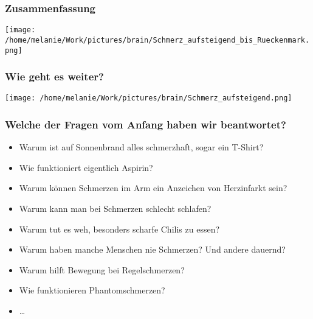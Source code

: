 \documentclass{beamer}
\begin{document}
\begin{frame}
\frametitle{Zusammenfassung}

\begin{center}
\texttt{[image: /home/melanie/Work/pictures/brain/Schmerz\_aufsteigend\_bis\_Rueckenmark.png]}
\end{center}

\end{frame}


\begin{frame}
\frametitle{Wie geht es weiter?}

\begin{center}
\texttt{[image: /home/melanie/Work/pictures/brain/Schmerz\_aufsteigend.png]}
\end{center}

\end{frame}





\begin{frame}
\frametitle{Welche der Fragen vom Anfang haben wir beantwortet?}

\begin{itemize}
\item
Warum ist auf Sonnenbrand alles schmerzhaft, sogar ein T-Shirt?
\item
Wie funktioniert eigentlich Aspirin? 
\item
Warum können Schmerzen im Arm ein Anzeichen von Herzinfarkt sein? 
\item
Warum kann man bei Schmerzen schlecht schlafen? 
\item
Warum tut es weh, besonders scharfe Chilis zu essen?
\item
Warum haben manche Menschen nie Schmerzen? Und andere dauernd?
\item
Warum hilft Bewegung bei Regelschmerzen? 
\item
Wie funktionieren Phantomschmerzen?  
\item
\dots 
\end{itemize}

\end{frame}
\end{document}

